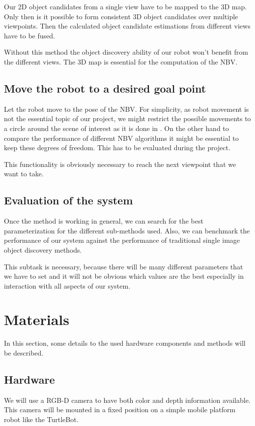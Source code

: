 \documentclass[a4paper,11pt,english]{article}
\begin{document}
Our 2D object candidates from a single view have to be mapped to the 3D map.
Only then is it possible to form consistent 3D object candidates over multiple viewpoints.
Then the calculated object candidate estimations from different views have to be fused.

Without this method the object discovery ability of our robot won't benefit from the different views.
The 3D map is essential for the computation of the NBV.

\subsection{Move the robot to a desired goal point}
Let the robot move to the pose of the NBV.
For simplicity, as robot movement is not the essential topic of our project, we might restrict the possible movements to a circle around the scene of interest as it is done in \cite{atanasov2014nonmyopic}. On the other hand to compare the performance of different NBV algorithms it might be essential to keep these degrees of freedom. This has to be evaluated during the project.

This functionality is obviously necessary to reach the next viewpoint that we want to take.

\subsection{Evaluation of the system}
Once the method is working in general, we can search for the best parameterization for the different sub-methods used.
Also, we can benchmark the performance of our system against the performance of traditional single image object discovery methods.

This subtask is necessary, because there will be many different parameters that we have to set and it will not be obvious which values are the best especially in interaction with all aspects of our system.

\section{Materials}\label{materials}
In this section, some details to the used hardware components and methods will be described.
\subsection{Hardware}
We will use a RGB-D camera to have both color and depth information available.
This camera will be mounted in a fixed position on a simple mobile platform robot like the TurtleBot.
\end{document}

